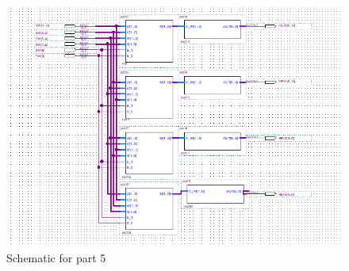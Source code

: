 \documentclass[a4paper, 12pt]{report}
\begin{document}
\clearpage
\begin{figure}[h]
    \centering
    \includegraphics[width=\textwidth]{source/picture/Lab1/Lab1_5.png}
    \caption{Schematic for part 5}
\end{figure}
\clearpage
\end{document}
